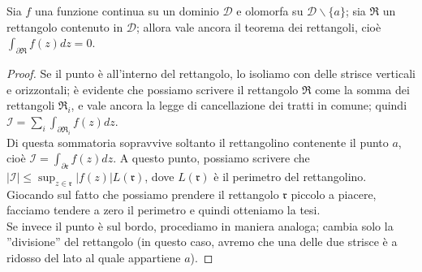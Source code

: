\begin{teorema}
Sia $f$ una funzione continua su un dominio $\mathcal{D}$ e olomorfa su $\mathcal{D} \backslash \{a\}$; sia $\mathfrak{R}$ un rettangolo contenuto in $\mathcal{D}$; allora vale ancora il teorema dei rettangoli, cioè $\int_{\partial \mathfrak{R}} f(z)dz=0$.
\end{teorema}
\begin{proof}
Se il punto è all'interno del rettangolo, lo isoliamo con delle strisce verticali e orizzontali; è evidente che possiamo scrivere il rettangolo $\mathfrak{R}$ come la somma dei rettangoli $\mathfrak{R}_i$, e vale ancora la legge di cancellazione dei tratti in comune; quindi $\mathcal{I}=\sum_i \int_{\partial \mathfrak{R}_i} f(z)dz$. \\ Di questa sommatoria sopravvive soltanto il rettangolino contenente il punto $a$, cioè $\mathcal{I}=\int_{\partial \mathfrak{r}} f(z)dz$. A questo punto, possiamo scrivere che $|\mathcal{I}| \leq \sup_{z \in \mathfrak{r}} |f(z)| L(\mathfrak{r})$, dove $L(\mathfrak{r})$ è il perimetro del rettangolino. \\ Giocando sul fatto che possiamo prendere il rettangolo $\mathfrak{r}$ piccolo a piacere, facciamo tendere a zero il perimetro e quindi otteniamo la tesi.\\Se invece il punto è sul bordo, procediamo in maniera analoga; cambia solo la ''divisione'' del rettangolo (in questo caso, avremo che una delle due strisce è a ridosso del lato al quale appartiene $a$).
\end{proof}

